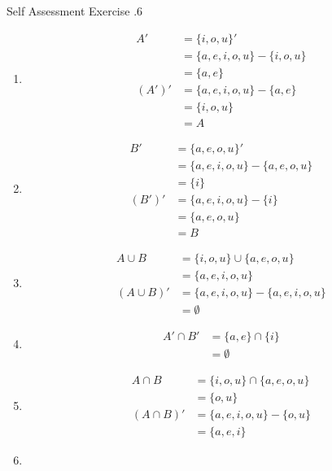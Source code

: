 \documentclass[../notes.tex]{subfiles}
\begin{document}
\begin{exercise}{Self Assessment Exercise \thechapter.6}
\begin{enumerate}
						\begin{enumerate}[label=(\alph*)]
							\item \moveup
								\begin{align*}
									A' &= \{i, o, u\}'\\
									&= \{a, e, i, o, u\} - \{i, o, u\}\\
									&= \{a, e\}\\
									\left(A'\right)' &= \{a, e, i, o, u\} - \{a, e\}\\
									&= \{i, o, u\}\\
									&= A
								\end{align*}
							\item \moveup
								\begin{align*}
									B' &= \{a, e, o, u\}'\\
									&= \{a, e, i, o, u\} - \{a, e, o, u\}\\
									&= \{i\}\\
									\left(B'\right)' &= \{a, e, i, o, u\} - \{i\}\\
									&= \{a, e, o, u\}\\
									&= B
								\end{align*}
							\item \moveup
								\begin{align*}
									A \cup B &= \{i, o, u\} \cup \{a, e, o, u\}\\
									&= \{a, e, i, o, u\}\\
									(A \cup B)' &= \{a, e, i, o, u\} - \{a, e, i, o, u\}\\
									&= \emptyset
								\end{align*}
							\item \moveup
								\begin{align*}
									A' \cap B' &= \{a, e\} \cap \{i\}\\
									&= \emptyset
								\end{align*}
							\item \moveup
								\begin{align*}
									A \cap B &= \{i, o, u\} \cap \{a, e, o, u\}\\
									&= \{o, u\}\\
									(A \cap B)' &= \{a, e, i, o, u\} - \{o, u\}\\
									&= \{a, e, i\}
								\end{align*}
							\item \moveup
								\begin{align*}

\end{align*}
\end{enumerate}
\end{enumerate}
\end{exercise}
\end{document}
